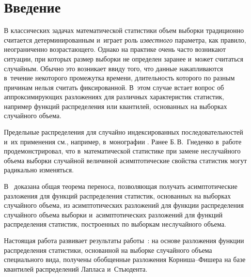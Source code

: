   



\thispagestyle{headings}

\begin{multicols}{2}

\label{st\stat}


\section{Введение}

В классических задачах математической статистики  объем выборки
традиционно считается детерминированным и~играет роль
\textit{известного} параметра, как правило, неограниченно
возрастающего. Однако на практике очень часто    возникают ситуации,
при которых размер выборки не определен заранее и~может считаться
случайным. Обычно это возникает ввиду того, что данные накапливаются
в~течение некоторого промежутка  времени, длительность которого по
разным причинам нельзя считать фиксированной. В~этом случае встает
вопрос об аппроксимирующих разложениях для различных характеристик
статистик, например функций распределения или квантилей, основанных
на выборках случайного объема. 

Предельные распределения для случайно
индексированных последовательностей и~их применения см., например, 
в~монографии \cite{Example3}. Ранее Б.\,В.~Гнеденко в~работе
\cite{Example1}  продемонстрировал, что в~математической статистике
при замене неслучайного объема выборки случайной величиной
асимп\-то\-ти\-ческие свойства статистик могут радикально изменяться. 

В~\cite{BenKorGal} доказана общая теорема переноса, позволяющая
получать асимптотические раз\-ло\-же\-ния для функций распределения
статистик, основанных на выборках случайного объема, из
асимптотических разложений для функции распределения случайного
объема выборки и~асимптотических разложений для функций
распределения  статистик, построенных по выборкам неслучайного
объема. 

Настоящая работа раз\-вивает результаты ра\-боты~\cite{BenKorGal}: 
на основе раз\-ложения функции распределения
статистики, основанной на выборке случайного объема специального
вида, получены обобщенные разложения Кор\-ни\-ша--Фи\-ше\-ра на базе
квантилей распределений Лапласа и~Стью\-дента. 
{ %

}


\end{multicols}
